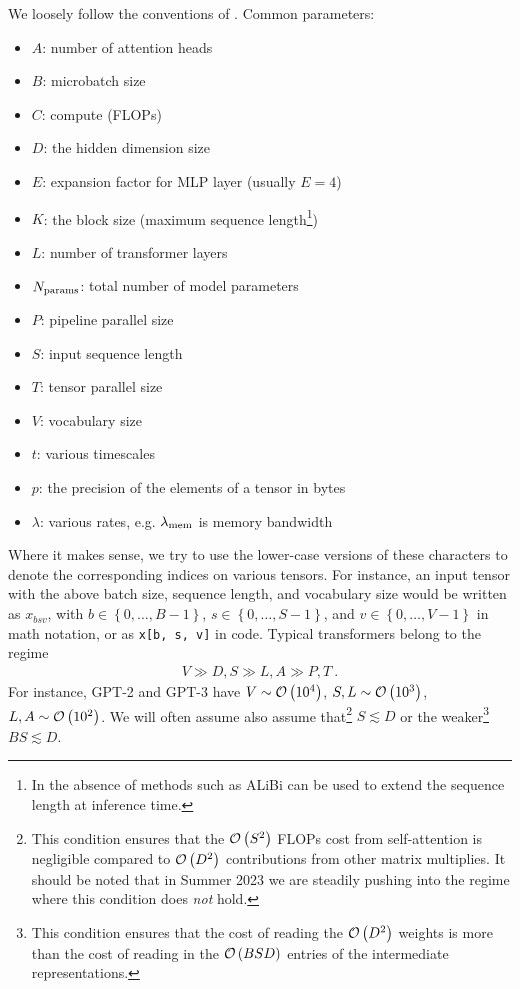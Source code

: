 \documentclass[11pt]{article}
\begin{document}
We loosely follow the conventions of \cite{korthikanti2022reducing}.  Common parameters:
\begin{itemize}
    \item $ A $: number of attention heads
    \item $ B $: microbatch size
    \item $ C $: compute (FLOPs)
    \item $ D $: the hidden dimension size
    \item $ E $: expansion factor for MLP layer (usually $ E=4 $)
    \item $ K $: the block size (maximum sequence length\footnote{In the absence of methods such as         ALiBi \cite{ALiBi}  can be used to extend the sequence length at inference time.})
    \item $ L $: number of transformer layers
    \item $ N _{ {\rm params}  } $: total number of model parameters
    \item $ P $: pipeline parallel size
    \item $ S $: input sequence length
    \item $ T $: tensor parallel size
    \item $ V $: vocabulary size
    \item $ t $: various timescales
    \item $ p $: the precision of the elements of a tensor in bytes
    \item $ \lambda  $: various rates, e.g. $ \lambda _{ {\rm mem}  } $ is memory bandwidth
\end{itemize}
Where it makes sense, we try to use the lower-case versions of these characters to denote the
corresponding indices on various tensors. For instance, an input tensor with the above batch size,
sequence length, and vocabulary size would be written as $ x _{ bsv } $, with $ b \in \left \{ 0,
\ldots, B - 1 \right \} $, $ s \in \left \{ 0, \ldots, S - 1\right \} $, and $  v \in \left \{ 0,
    \ldots, V -1\right \}$ in math notation, or as \texttt{x[b, s, v]} in code.  Typical
    transformers belong to the regime
\begin{gather}
V \gg D, S \gg L, A \gg P, T \ .  \label{app_eq_transformers_approxs}
\end{gather}
For instance, GPT-2 and GPT-3 \cite{gpt2radford2019language, gpt3brown2020language} have $ V \sim
\mathcal{O} \left( 10 ^{ 4 } \right)  $, $ S, L \sim \mathcal{O} \left( 10 ^{ 3 } \right)  $, $ L, A \sim \mathcal{O}
\left( 10 ^{ 2 } \right)  $. We will often assume also assume that\footnote{This condition ensures
    that the $ \mathcal{O} \left( S ^{ 2 } \right)  $ FLOPs cost from self-attention is negligible
compared to $ \mathcal{O} \left( D ^{ 2 } \right)  $ contributions from other matrix multiplies.  It
should be noted that in Summer 2023 we are steadily pushing into the regime where this condition
does \textit{not}  hold.} $ S \lesssim D $ or the weaker\footnote{This condition ensures that the
cost of reading the $ \mathcal{O} \left( D ^{ 2 } \right)  $ weights is more than the cost of reading in
the $ \mathcal{O} \left( BSD \right)  $ entries of the intermediate representations.} $ BS \lesssim D $.
\end{document}
